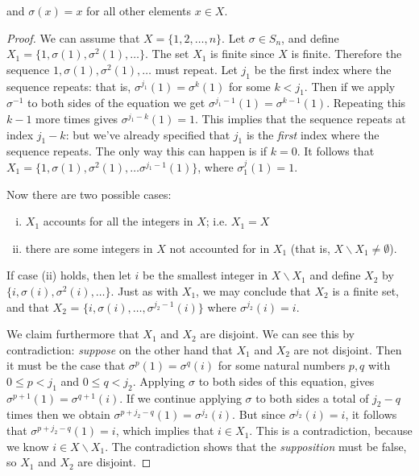 \noindent
and $\sigma( x) =x$ for all other elements $x \in X$.


\begin{proof}
We can assume that $X = \{ 1, 2, \ldots, n \}$. Let $\sigma \in S_n$,
and define $X_1 = \{1,  \sigma(1), \sigma^2(1), \ldots \}$. The set $X_1$ is finite since $X$ is finite. Therefore the sequence  $1, \sigma(1), \sigma^2(1), \ldots $ must repeat. Let $j_1$ be the first index where the sequence repeats: that is, $\sigma^{j_1}(1) = \sigma^k(1)$ for some $k < j_1$.  Then if we apply $\sigma^{-1}$  to both sides of the equation we get 
$\sigma^{j_1-1}(1) = \sigma^{k-1}(1)$. Repeating this $k-1$ more times gives $\sigma^{j_1-k}(1) = 1$. This implies that the sequence repeats at index $j_1-k$: but we've already specified that $j_1$ is the \emph{first} index where the sequence repeats. The only way this can happen is if $k=0$. It follows that $X_1 = \{1, \sigma(1), \sigma^2(1), \ldots \sigma^{j_1-1}(1) \}$, where $\sigma^j_1(1) = 1$.

Now there are two possible cases: 

\begin{enumerate}[(i)]
\item
$X_1$ accounts for all the integers in $X$; i.e. $X_1 = X$ 
\item
there are some integers in $X$ not accounted for in $X_1$ (that is, $X \backslash X_1 \neq \emptyset$).  
\end{enumerate}

If case (ii) holds, then  let $i$ be the smallest integer
in $X \backslash X_1$ and define $X_2$ by $\{ i, \sigma(i),
\sigma^2(i), \ldots \}$. Just as with $X_1$, we may conclude that $X_2$ is a finite set, and that $X_2$ = $\{ i, \sigma(i), \ldots, \sigma^{j_2-1}(i) \}$ where $\sigma^{j_2}(i) = i$.

We claim furthermore that  $X_1$ and $X_2$ are disjoint. We can see this by contradiction: \emph{suppose} on the other hand that $X_1$ and $X_2$ are not disjoint. Then it must be the case that $\sigma^p(1) = \sigma^q(i)$ for some natural numbers $p, q$ with $0 \le p < j_1$ and $0 \le q < j_2$. Applying $\sigma$ to both sides of this equation, gives $\sigma^{p+1}(1) = \sigma^{q+1}(i)$. If we  continue applying $\sigma$ to both sides a total of $j_2 - q$ times then we obtain $\sigma^{p+j_2 - q}(1) = \sigma^{j_2}(i)$. But since $\sigma^{j_2}(i) = i$, it follows that $\sigma^{p+j_2 - q}(1) = i$, which implies that $i \in X_1$. This is a contradiction, because we know $i \in X \backslash X_1$. The contradiction shows that the \emph{supposition} must be false, so $X_1$ and $X_2$ are disjoint.


\end{proof}

